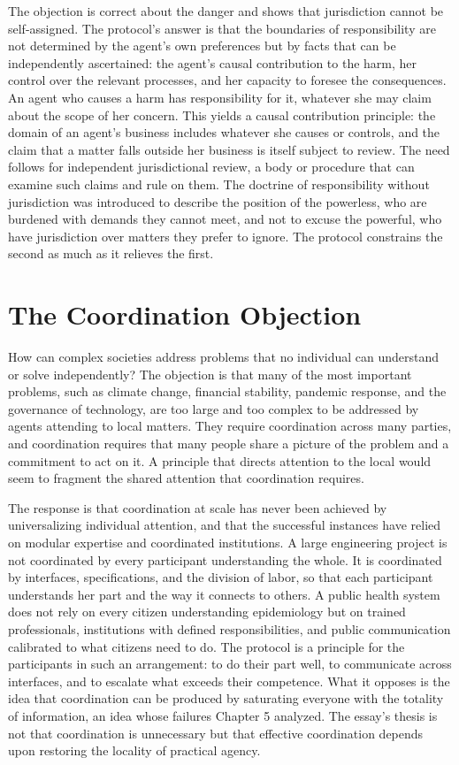 \documentclass[11pt]{report}
\theoremstyle{definition}
\theoremstyle{remark}
\begin{document}
The objection is correct about the danger and shows that jurisdiction cannot be self-assigned. The protocol's answer is that the boundaries of responsibility are not determined by the agent's own preferences but by facts that can be independently ascertained: the agent's causal contribution to the harm, her control over the relevant processes, and her capacity to foresee the consequences. An agent who causes a harm has responsibility for it, whatever she may claim about the scope of her concern. This yields a causal contribution principle: the domain of an agent's business includes whatever she causes or controls, and the claim that a matter falls outside her business is itself subject to review. The need follows for independent jurisdictional review, a body or procedure that can examine such claims and rule on them. The doctrine of responsibility without jurisdiction was introduced to describe the position of the powerless, who are burdened with demands they cannot meet, and not to excuse the powerful, who have jurisdiction over matters they prefer to ignore. The protocol constrains the second as much as it relieves the first.

\section{The Coordination Objection}

How can complex societies address problems that no individual can understand or solve independently? The objection is that many of the most important problems, such as climate change, financial stability, pandemic response, and the governance of technology, are too large and too complex to be addressed by agents attending to local matters. They require coordination across many parties, and coordination requires that many people share a picture of the problem and a commitment to act on it. A principle that directs attention to the local would seem to fragment the shared attention that coordination requires.

The response is that coordination at scale has never been achieved by universalizing individual attention, and that the successful instances have relied on modular expertise and coordinated institutions. A large engineering project is not coordinated by every participant understanding the whole. It is coordinated by interfaces, specifications, and the division of labor, so that each participant understands her part and the way it connects to others. A public health system does not rely on every citizen understanding epidemiology but on trained professionals, institutions with defined responsibilities, and public communication calibrated to what citizens need to do. The protocol is a principle for the participants in such an arrangement: to do their part well, to communicate across interfaces, and to escalate what exceeds their competence. What it opposes is the idea that coordination can be produced by saturating everyone with the totality of information, an idea whose failures Chapter 5 analyzed. The essay's thesis is not that coordination is unnecessary but that effective coordination depends upon restoring the locality of practical agency.
\end{document}
